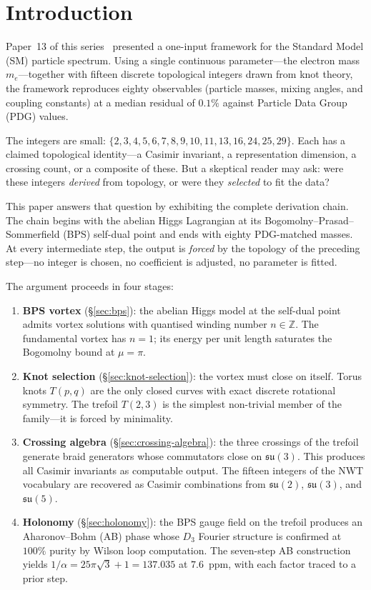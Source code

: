 \documentclass[11pt]{article}
\newcommand{\su}{\mathfrak{su}}
\begin{document}
\section{Introduction}
\label{sec:intro}

Paper~13 of this series~\cite{paper13} presented a one-input
framework for the Standard Model (SM) particle spectrum.  Using a
single continuous parameter---the electron mass $m_e$---together
with fifteen discrete topological integers drawn from knot theory,
the framework reproduces eighty observables (particle masses,
mixing angles, and coupling constants) at a median residual of
$0.1\%$ against Particle Data Group (PDG) values.

The integers are small: $\{2, 3, 4, 5, 6, 7, 8, 9, 10, 11, 13,
16, 24, 25, 29\}$.  Each has a claimed topological identity---a
Casimir invariant, a representation dimension, a crossing count,
or a composite of these.  But a skeptical reader may ask: were
these integers \emph{derived} from topology, or were they
\emph{selected} to fit the data?

This paper answers that question by exhibiting the complete
derivation chain.  The chain begins with the abelian Higgs
Lagrangian at its Bogomolny--Prasad--Sommerfield (BPS) self-dual
point and ends with eighty PDG-matched masses.  At every
intermediate step, the output is \emph{forced} by the topology of
the preceding step---no integer is chosen, no coefficient is
adjusted, no parameter is fitted.

The argument proceeds in four stages:
\begin{enumerate}\setlength\itemsep{2pt}
  \item \textbf{BPS vortex} (\S\ref{sec:bps}): the abelian Higgs
    model at the self-dual point admits vortex solutions with
    quantised winding number $n \in \mathbb{Z}$.  The fundamental
    vortex has $n = 1$; its energy per unit length saturates the
    Bogomolny bound at $\mu = \pi$.
  \item \textbf{Knot selection} (\S\ref{sec:knot-selection}): the
    vortex must close on itself.  Torus knots $T(p,q)$ are the
    only closed curves with exact discrete rotational symmetry.
    The trefoil $T(2,3)$ is the simplest non-trivial member of
    the family---it is forced by minimality.
  \item \textbf{Crossing algebra} (\S\ref{sec:crossing-algebra}):
    the three crossings of the trefoil generate braid generators
    whose commutators close on $\su(3)$.  This produces all
    Casimir invariants as computable output.  The fifteen integers
    of the NWT vocabulary are recovered as Casimir combinations
    from $\su(2)$, $\su(3)$, and $\su(5)$.
  \item \textbf{Holonomy} (\S\ref{sec:holonomy}): the BPS gauge
    field on the trefoil produces an Aharonov--Bohm (AB) phase
    whose $D_3$ Fourier structure is confirmed at $100\%$ purity
    by Wilson loop computation.  The seven-step AB construction
    yields $1/\alpha = 25\pi\sqrt{3}+1 = 137.035$ at $7.6$~ppm,
    with each factor traced to a prior step.
\end{enumerate}
\end{document}
